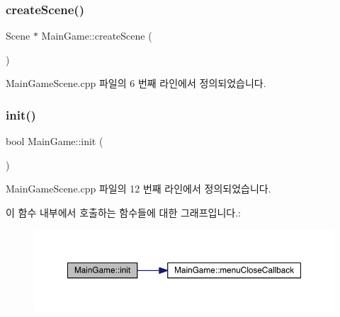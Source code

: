 \mbox{\label{class_main_game_a4d902c709107b834b3cb1dcb8debc1aa}} 
\subsubsection{\texorpdfstring{create\+Scene()}{createScene()}}
{\footnotesize\ttfamily Scene $\ast$ Main\+Game\+::create\+Scene (\begin{DoxyParamCaption}{ }\end{DoxyParamCaption})\hspace{0.3cm}{\ttfamily [static]}}



Main\+Game\+Scene.\+cpp 파일의 6 번째 라인에서 정의되었습니다.

\mbox{\label{class_main_game_ab518edeb854c0447539b829790397dc6}} 
\subsubsection{\texorpdfstring{init()}{init()}}
{\footnotesize\ttfamily bool Main\+Game\+::init (\begin{DoxyParamCaption}{ }\end{DoxyParamCaption})\hspace{0.3cm}{\ttfamily [virtual]}}



Main\+Game\+Scene.\+cpp 파일의 12 번째 라인에서 정의되었습니다.

이 함수 내부에서 호출하는 함수들에 대한 그래프입니다.\+:
\nopagebreak
\begin{figure}[H]
\begin{center}
\leavevmode
\includegraphics[width=350pt]{class_main_game_ab518edeb854c0447539b829790397dc6_cgraph}
\end{center}
\end{figure}
\mbox{\label{class_main_game_a824206defd2b5af2359c3699aa55e289}} 
